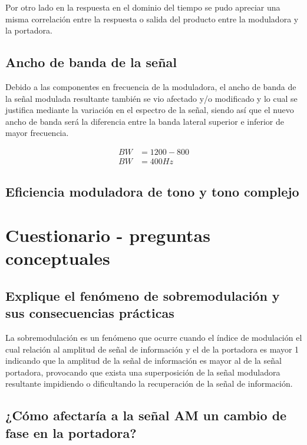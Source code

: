 \documentclass[conference]{IEEEtran}
\begin{document}
	Por otro lado en la respuesta en el dominio del tiempo se pudo apreciar una misma correlación entre la respuesta o salida del producto entre la moduladora y la portadora.
	
	\subsection{\textbf{Ancho de banda de la señal}}
	
	Debido a las componentes en frecuencia de la moduladora, el ancho de banda de la señal modulada resultante también se vio afectado y/o modificado y lo cual se justifica mediante la variación en el espectro de la señal, siendo así que el nuevo ancho de banda será la diferencia entre la banda lateral superior e inferior de mayor frecuencia.
	
	\begin{align}
		BW &= 1200 - 800 \\
		BW &= 400 Hz
	\end{align}
	
	\subsection{Eficiencia moduladora de tono y tono complejo}
	
	\section{Cuestionario - preguntas conceptuales}
	
	\subsection{\textbf{Explique el fenómeno de sobremodulación y sus consecuencias prácticas}}
	
	La sobremodulación es un fenómeno que ocurre cuando el índice de modulación el cual relación al amplitud de señal de información y el de la portadora es mayor 1 indicando que la amplitud de la señal de información es mayor al de la señal portadora, provocando que exista una superposición de la señal moduladora resultante impidiendo o dificultando la recuperación de la señal de información.
	
	\subsection{\textbf{¿Cómo afectaría a la señal AM un cambio de fase en la portadora?}}
	
\end{document}
